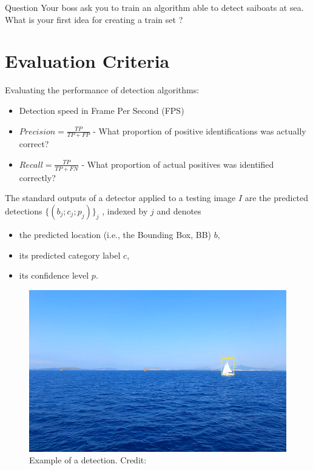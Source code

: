 \documentclass{beamer}
\begin{document}
\begin{frame}{Question}
	Your boss ask you to train an algorithm able to detect saiboats at sea.
	What is your first idea for creating a train set ?
\end{frame}


\section{Evaluation Criteria}


\begin{frame}
	Evaluating the performance of detection algorithms:
    \begin{itemize}
        \item Detection speed in Frame Per Second (FPS)
        \item $Precision = \frac{TP}{TP + FP}$ - What proportion of positive identifications was actually correct?
        \item $Recall = \frac{TP}{TP + FN}$ - What proportion of actual positives was identified correctly?
    \end{itemize}
	The standard outputs of a detector applied to a testing image $I$ are the predicted detections $\{(b_j ; c_j ; p_j)\}_j$ , indexed by $j$ and denotes
	\begin{itemize}
		\item the predicted location (i.e., the Bounding Box, BB) $b$,
		\item its predicted category label $c$,
		\item its confidence level $p$.
	\end{itemize}
\end{frame}

\begin{frame}
	\begin{figure}
		\includegraphics[width=\textwidth]{images/detection_example.png}
		\caption{Example of a detection.
			\hbox{\scriptsize Credit:}
		}
	\end{figure}
\end{frame}
\end{document}
